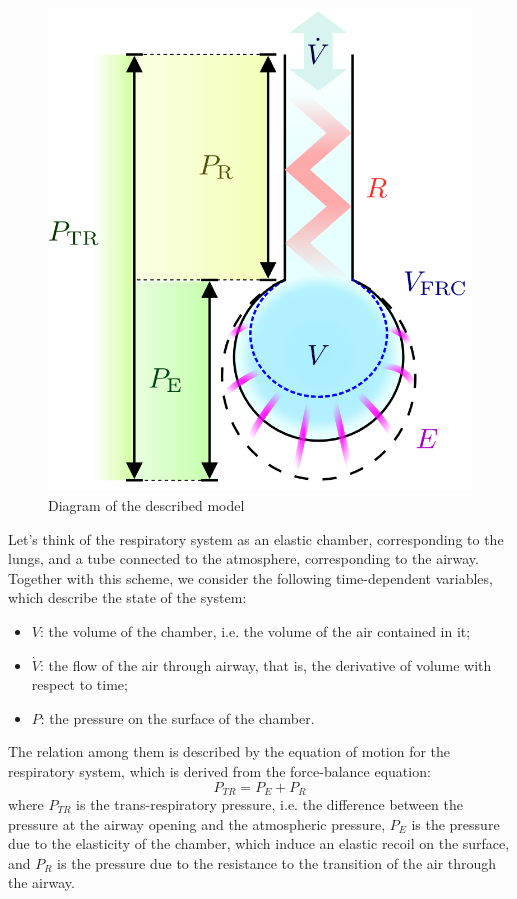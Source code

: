 \documentclass[a4paper, twoside]{article}
\begin{document}
    \begin{figure}
        \includegraphics[width=1\linewidth]{PulmVenti.PNG}
        \caption{Diagram of the described model}
        \label{fig:pulmvent}
    \end{figure}

    Let's think of the respiratory system as an elastic chamber, corresponding to the lungs, and a tube connected to the atmosphere, corresponding to the airway. Together with this scheme, we consider the following time-dependent variables, which describe the state of the system:
    \begin{itemize}
        \item $V$: the volume of the chamber, i.e. the volume of the air contained in it;
        \item $\dot{V}$: the flow of the air through airway, that is, the derivative of volume with respect to time;
        \item $P$: the pressure on the surface of the chamber.
    \end{itemize}
     The relation among them is described by the equation of motion for the respiratory system, which is derived from the force-balance equation:
     $$ P_{TR} = P_E + P_R $$
     where $P_{TR}$ is the trans-respiratory pressure, i.e. the difference between the pressure at the airway opening and the atmospheric pressure, $P_E$ is the pressure due to the elasticity of the chamber, which induce an elastic recoil on the surface, and $P_R$ is the pressure due to the resistance to the transition of the air through the airway.
\end{document}

